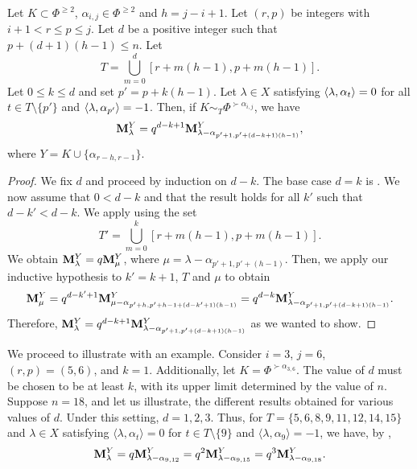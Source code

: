 \begin{lemma}\rm\label{Claim: free Q}
        Let $K \subset \Phi^{\geq 2}$, $\alpha_{i,j} \in \Phi^{\geq 2}$ and  $h = j - i + 1$.
        Let $(r,p)$ be integers with $i + 1 < r \leq p \leq j$. 
        Let  $d$ be a positive integer such that $p+(d+1)(h-1)\leq n$. 
        Let 
        $$T = \bigcup_{m = 0}^{d} [r + m(h - 1), p + m(h - 1)].$$
        Let $0\leq k \leq d$ and set $p'=p+k(h-1)$. 
        Let $\lambda \in X$ satisfying $\langle \lambda , \alpha_t \rangle = 0$ for all $t \in T \setminus \{p'\}$ and $\langle \lambda , \alpha_{p'} \rangle = -1$. 
        Then, if $K \sim_{T} \Phi^{\succ \alpha_{i,j}}$, we have
    \begin{equation}
        \mathbf{M}_{\lambda}^{Y} = q^{d-k+1}\mathbf{M}_{\lambda-\alpha_{p'+1,p'+(d-k+1)(h-1)}}^{Y},
    \end{equation}
    where $Y = K \cup \{\alpha_{r-h, r-1}\}$.
    \end{lemma}
    \begin{proof}
We fix $d$ and proceed by induction on $d-k$. 
The base case $d=k$ is . We now assume that  $0<d-k$ and that the result holds for all $k'$ such that $d-k'<d-k$.   We apply  using the set 
         $$T' = \bigcup_{m = 0}^{k} [r + m(h - 1), p + m(h - 1)].$$
We obtain $\mathbf{M}_{\lambda}^{Y}=q\mathbf{M}_{\mu}^{Y}$, where $\mu=\lambda - \alpha_{p'+1,p'+(h-1)}$. Then, we apply our inductive hypothesis to  $k'=k+1$, $T$ and $\mu$ to obtain 
       \begin{equation}
           \mathbf{M}_{\mu}^{Y}=q^{d-k'+1}\mathbf{M}_{\mu-\alpha_{p'+h,p'+h-1+(d-k'+1)(h -1)}}^{Y} =q^{d-k}\mathbf{M}_{\lambda-\alpha_{p'+1,p'+(d-k+1)(h -1)}}^{Y} .
       \end{equation}
Therefore, $\mathbf{M}_{\lambda}^{Y} = q^{d-k+1}\mathbf{M}_{\lambda-\alpha_{p'+1,p'+(d-k+1)(h -1)}}^{Y}$ as we wanted to show. 
   \end{proof} 

\begin{example}\rm
    We proceed to illustrate  with an example. Consider $i = 3$, $j = 6$, $(r, p) = (5, 6)$, and $k = 1$.  
Additionally, let $K = \Phi^{\succ \alpha_{3,6}}$.  
The value of $d$ must be chosen to be at least $k$, with its upper limit determined by the value of $n$. Suppose $n=18$, and let us illustrate, the different results obtained for various values of $d$.  
Under this setting, $d = 1, 2, 3$. Thus, for $T = \{5,6, 8,9,11,12,14,15\}$ and $\lambda \in X$ satisfying $\langle \lambda, \alpha_{t} \rangle = 0$ for $t \in T\setminus \{9\}$ and $\langle \lambda, \alpha_{9} \rangle = -1$, we have, by ,  
\begin{equation}
    \mathbf{M}_{\lambda}^{Y} = q\mathbf{M}_{\lambda - \alpha_{9,12}}^{Y} = q^2\mathbf{M}_{\lambda - \alpha_{9,15}}^{Y} = q^3\mathbf{M}_{\lambda - \alpha_{9,18}}^{Y}.
\end{equation}

\end{example}

